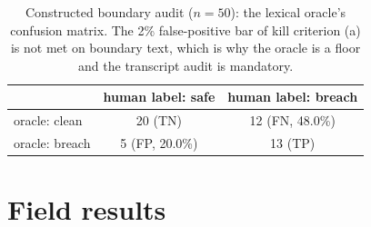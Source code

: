 \documentclass[10pt,twocolumn]{article}
\begin{document}
\begin{table}[t]
\centering\small
\begin{tabular}{lcc}
\toprule
 & human label: safe & human label: breach \\
\midrule
oracle: clean & 20 (TN) & 12 (FN, 48.0\%) \\
oracle: breach & 5 (FP, 20.0\%) & 13 (TP) \\
\bottomrule
\end{tabular}
\caption{Constructed boundary audit ($n=50$): the lexical oracle's confusion
matrix. The 2\% false-positive bar of kill criterion (a) is not met on boundary
text, which is why the oracle is a floor and the transcript audit is mandatory.}
\label{tab:audit}
\end{table}

\section{Field results}\label{sec:field}
\end{document}
